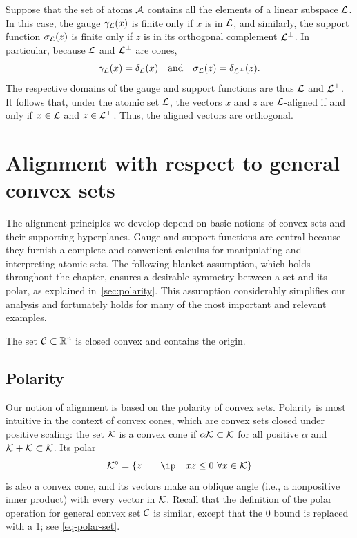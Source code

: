   \begin{example} \label{example-linear-subspaces}

    Suppose that the set of atoms $\mathcal{A}$ contains all the elements of a
    linear subspace $\mathcal{L}$. In this case, the gauge $\gamma_{\mathcal{L}}(x)$
    is finite only if $x$ is in $\mathcal{L}$, and similarly, the support
    function $\sigma_{\mathcal{L}}(z)$ is finite only if $z$ is in its
    orthogonal complement $\mathcal{L}^\perp$. In particular, because $\mathcal{L}$ and
    $\mathcal{L}^\perp$ are cones,
    \[
      \gamma_{\mathcal{L}}(x) = \delta_{\mathcal{L}}(x)
      \hbox{\quad and\quad}
      \sigma_{\mathcal{L}}(z) = \delta_{\mathcal{L}^\perp}(z).
    \]
  The respective domains of the
    gauge and support functions are thus $\mathcal{L}$ and $\mathcal{L}^\perp$. It
    follows that, under the atomic set $\mathcal{L}$, the vectors $x$ and $z$ are
    $\mathcal{L}$-aligned if and only if $x\in\mathcal{L}$ and $z\in\mathcal{L}^\perp$. Thus, the aligned
    vectors are orthogonal.
  \end{example}
  

\section{Alignment with respect to general convex sets} \label{sec:convexanalysis}

The alignment principles we develop depend on basic notions of convex sets and
their supporting hyperplanes. Gauge and support functions are central because
they furnish a complete and convenient calculus for manipulating and
interpreting atomic sets. The following blanket assumption, which holds
throughout the chapter, ensures a desirable symmetry between a set and its polar,
as explained in~\autoref{sec:polarity}. This assumption considerably simplifies our
analysis and fortunately holds for many of the most important and relevant
examples.
\begin{assumption} \label{blanket-assumption} The set
  $\mathcal{C}\subset\mathbb{R}^n$ is closed convex and contains the origin.
\end{assumption}

\subsection{Polarity} \label{sec:polarity}

Our notion of alignment is based on the polarity of convex sets. Polarity is
most intuitive in the context of convex cones, which are convex sets closed
under positive scaling: the set $\mathcal{K}$ is a convex cone if
$\alpha\mathcal{K}\subset\mathcal{K}$ for all positive $\alpha$ and $\mathcal{K} + \mathcal{K} \subset
\mathcal{K}$. Its polar
\begin{equation} \label{eq-polar-cone}
  \Kscr\polar=\{z ~|~ \ip x z \le 0 \ \forall x\in\Kscr\}
\end{equation}
is also a convex cone, and its vectors make an oblique angle (i.e., a
nonpositive inner product) with every vector in $\mathcal{K}$. Recall that the definition of the polar operation for general convex set $\mathcal{C}$ is similar, except that the 0
bound is replaced with a 1; see \eqref{eq-polar-set}.

